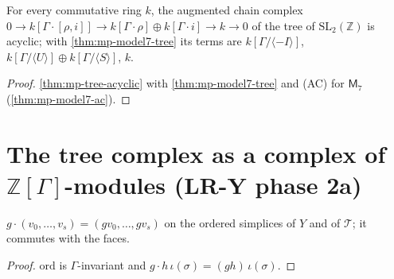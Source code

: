 \begin{theorem}\label{thm:mp-treeses-exact}
  \leanok
  For every commutative ring $k$, the augmented chain complex
  $0\to k[\Gamma\cdot[\rho,i]]\to k[\Gamma\cdot\rho]\oplus k[\Gamma\cdot i]\to k\to0$ of the tree of $\mathrm{SL}_2(\mathbb Z)$ is
  acyclic; with \ref{thm:mp-model7-tree} its terms are $k[\Gamma/\langle-I\rangle]$, $k[\Gamma/\langle U\rangle]\oplus k[\Gamma/\langle S\rangle]$, $k$.
\end{theorem}
\begin{proof}
  \leanok
  \ref{thm:mp-tree-acyclic} with \ref{thm:mp-model7-tree} and (AC) for $\mathsf M_7$ (\ref{thm:mp-model7-ac}).
\end{proof}

\section{The tree complex as a complex of \texorpdfstring{$\mathbb Z[\Gamma]$}{Z[Gamma]}-modules (LR-Y phase 2a)}

\begin{definition}\label{def:mp-ys-action}
  \leanok
  $g\cdot(v_0,\dots,v_s)=(gv_0,\dots,gv_s)$ on the ordered simplices of $Y$ and of $\mathcal T$; it commutes with the faces.
\end{definition}
\begin{proof}
  \leanok
  $\mathrm{ord}$ is $\Gamma$-invariant and $g\cdot h\,\iota(\sigma)=(gh)\,\iota(\sigma)$.
\end{proof}

